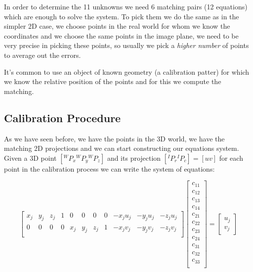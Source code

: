 In order to determine the 11 unknowns we need 6 matching pairs (12 equations) which are enough to solve the system. To pick them we do the same as in the simpler 2D case, we choose points in the real world for whom we know the coordinates and we choose the same points in the image plane, we need to be very precise in picking these points, so usually we pick a \textit{higher number} of points to average out the errors.

It's common to use an object of known geometry (a calibration patter) for which we know the relative position of the points and for this we compute the matching.


\subsection{Calibration Procedure}

As we have seen before, we have the points in the 3D world, we have the matching 2D projections and we can start constructing our equations system.
\\
Given a 3D point \([{}^WP_x {}^WP_y {}^WP_z]\) and its projection \([{}^IP_r {}^IP_c] = [u v]\) for each point in the calibration process we can write the system of equations:
\setcounter{MaxMatrixCols}{20}

\[
    \begin{bmatrix}
        x_j & y_j & z_j & 1 & 0 & 0 & 0 & 0 & -x_ju_j & -y_ju_j & -z_ju_j \\
        0 & 0 & 0 & 0 & x_j & y_j & z_j & 1 & -x_jv_j & -y_jv_j & -z_jv_j \\
    \end{bmatrix}
    \begin{bmatrix}
        c_{11} \\
        c_{12} \\
        c_{13} \\
        c_{14} \\
        c_{21} \\
        c_{22} \\
        c_{23} \\
        c_{24} \\
        c_{31} \\
        c_{32} \\
        c_{33} \\
    \end{bmatrix}
    =
    \begin{bmatrix}
        u_j \\
        v_j
    \end{bmatrix}
\]

